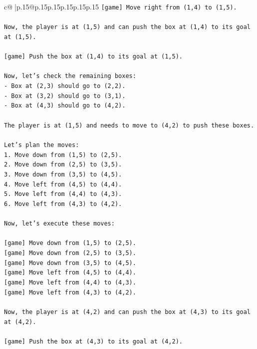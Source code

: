 \documentclass{article}
\begin{document}
{\begin{supertabular}{c@{$\;$}|p{.15\linewidth}@{}p{.15\linewidth}p{.15\linewidth}p{.15\linewidth}p{.15\linewidth}p{.15\linewidth}}
{{{\texttt{{[}game{]} Move right from (1,4) to (1,5).} \\
\\ 
\texttt{Now, the player is at (1,5) and can push the box at (1,4) to its goal at (1,5).} \\
\\ 
\texttt{{[}game{]} Push the box at (1,4) to its goal at (1,5).} \\
\\ 
\texttt{Now, let's check the remaining boxes:} \\
\texttt{{-} Box at (2,3) should go to (2,2).} \\
\texttt{{-} Box at (3,2) should go to (3,1).} \\
\texttt{{-} Box at (4,3) should go to (4,2).} \\
\\ 
\texttt{The player is at (1,5) and needs to move to (4,2) to push these boxes.} \\
\\ 
\texttt{Let's plan the moves:} \\
\texttt{1. Move down from (1,5) to (2,5).} \\
\texttt{2. Move down from (2,5) to (3,5).} \\
\texttt{3. Move down from (3,5) to (4,5).} \\
\texttt{4. Move left from (4,5) to (4,4).} \\
\texttt{5. Move left from (4,4) to (4,3).} \\
\texttt{6. Move left from (4,3) to (4,2).} \\
\\ 
\texttt{Now, let's execute these moves:} \\
\\ 
\texttt{{[}game{]} Move down from (1,5) to (2,5).} \\
\texttt{{[}game{]} Move down from (2,5) to (3,5).} \\
\texttt{{[}game{]} Move down from (3,5) to (4,5).} \\
\texttt{{[}game{]} Move left from (4,5) to (4,4).} \\
\texttt{{[}game{]} Move left from (4,4) to (4,3).} \\
\texttt{{[}game{]} Move left from (4,3) to (4,2).} \\
\\ 
\texttt{Now, the player is at (4,2) and can push the box at (4,3) to its goal at (4,2).} \\
\\ 
\texttt{{[}game{]} Push the box at (4,3) to its goal at (4,2).} \\
}}}
\end{supertabular}}
\end{document}
